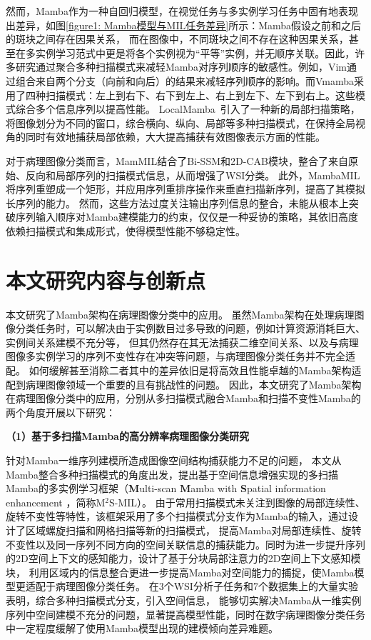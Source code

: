 然而，Mamba作为一种自回归模型，在视觉任务与多实例学习任务中固有地表现出差异，如图\ref{figure1: Mamba模型与MIL任务差异}所示：Mamba假设之前和之后的斑块之间存在因果关系\cite{liu2024vmamba}，
而在图像中，不同斑块之间不存在这种因果关系，甚至在多实例学习范式中更是将各个实例视为“平等”实例，并无顺序关联。因此，许多研究通过聚合多种扫描模式来减轻Mamba对序列顺序的敏感性。例如，Vim\cite{zhu2024vision}通过组合来自两个分支（向前和向后）的结果来减轻序列顺序的影响。而Vmamba\cite{liu2024vmamba}采用了四种扫描模式：左上到右下、右下到左上、右上到左下、左下到右上。这些模式综合多个信息序列以提高性能。 LocalMamba~\cite{huang2024localmamba}引入了一种新的局部扫描策略，将图像划分为不同的窗口，综合横向、纵向、局部等多种扫描模式，在保持全局视角的同时有效地捕获局部依赖，大大提高捕获有效图像表示方面的性能。

对于病理图像分类而言，MamMIL\cite{fang2024mammil}结合了Bi-SSM和2D-CAB模块，整合了来自原始、反向和局部序列的扫描模式信息，从而增强了WSI分类。
此外，MambaMIL\cite{yang2024mambamil}将序列重塑成一个矩形，并应用序列重排序操作来垂直扫描新序列，提高了其模拟长序列的能力。
然而，这些方法过度关注输出序列信息的整合，未能从根本上突破序列输入顺序对Mamba建模能力的约束，仅仅是一种妥协的策略，其依旧高度依赖扫描模式和集成形式，使得模型性能不够稳定性。

\section[\hspace{-2pt}本文研究内容与创新点]{{\heiti{} \hspace{-8pt}本文研究内容与创新点}}\label{section1: 本文研究内容与创新点}

本文研究了Mamba架构在病理图像分类中的应用。
虽然Mamba架构在处理病理图像分类任务时，可以解决由于实例数目过多导致的问题，例如计算资源消耗巨大、实例间关系建模不充分等，
但其仍然存在其无法捕获二维空间关系、以及与病理图像多实例学习的序列不变性存在冲突等问题，与病理图像分类任务并不完全适配。
如何缓解甚至消除二者其中的差异依旧是将高效且性能卓越的Mamba架构适配到病理图像领域一个重要的且有挑战性的问题。
因此，本文研究了Mamba架构在病理图像分类中的应用，分别从多扫描模式融合Mamba和扫描不变性Mamba的两个角度开展以下研究：

\textbf{（1）基于多扫描Mamba的高分辨率病理图像分类研究}

针对Mamba一维序列建模所造成图像空间结构捕获能力不足的问题，
本文从Mamba整合多种扫描模式的角度出发，提出基于空间信息增强实现的多扫描Mamba的多实例学习框架（\textbf{M}ulti-scan \textbf{M}amba with \textbf{S}patial information enhancement ，简称M$^2$S-MIL）。
由于常用扫描模式未关注到图像的局部连续性、旋转不变性等特性，该框架采用了多个扫描模式分支作为Mamba的输入，通过设计了区域螺旋扫描和网格扫描等新的扫描模式，
提高Mamba对局部连续性、旋转不变性以及同一序列不同方向的空间关联信息的捕获能力。同时为进一步提升序列的2D空间上下文的感知能力，设计了基于分块局部注意力的2D空间上下文感知模块，
利用区域内的信息整合更进一步提高Mamba对空间能力的捕捉，使Mamba模型更适配于病理图像分类任务。
在3个WSI分析子任务和7个数据集上的大量实验表明，综合多种扫描模式分支，引入空间信息，
能够切实解决Mamba从一维实例序列中空间建模不充分的问题，显著提高模型性能，同时在数字病理图像分类任务中一定程度缓解了使用Mamba模型出现的建模倾向差异难题。​

